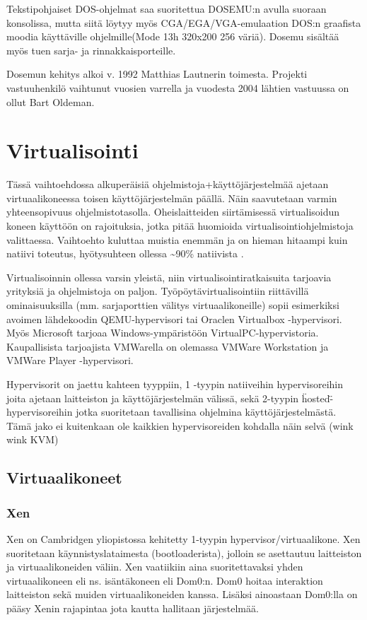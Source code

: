Tekstipohjaiset DOS-ohjelmat saa suoritettua DOSEMU:n avulla suoraan konsolissa, mutta siitä löytyy myös CGA/EGA/VGA-emulaation DOS:n graafista moodia käyttäville ohjelmille(Mode 13h 320x200 256 väriä). Dosemu sisältää myös tuen sarja- ja rinnakkaisporteille.

Dosemun kehitys alkoi v. 1992 Matthias Lautnerin toimesta. Projekti vastuuhenkilö vaihtunut vuosien varrella ja vuodesta 2004 lähtien vastuussa on ollut Bart Oldeman.




\section{Virtualisointi}

Tässä vaihtoehdossa alkuperäisiä ohjelmistoja+käyttöjärjestelmää ajetaan virtuaalikoneessa toisen käyttöjärjestelmän päällä. Näin saavutetaan varmin yhteensopivuus ohjelmistotasolla. Oheislaitteiden siirtämisessä virtualisoidun koneen käyttöön on rajoituksia, jotka pitää huomioida virtualisointiohjelmistoja valittaessa. Vaihtoehto kuluttaa muistia enemmän ja on hieman hitaampi kuin natiivi toteutus, hyötysuhteen ollessa \textasciitilde{}90\%  natiivista \cite{virtnat_anadtech}.

Virtualisoinnin ollessa varsin yleistä, niin virtualisointiratkaisuita tarjoavia yrityksiä ja ohjelmistoja on paljon. Työpöytävirtualisointiin riittävillä ominaisuuksilla (mm. sarjaporttien välitys virtuaalikoneille) sopii esimerkiksi avoimen lähdekoodin QEMU-hypervisori tai Oraclen Virtualbox -hypervisori. Myös Microsoft tarjoaa Windows-ympäristöön VirtualPC-hypervistoria. Kaupallisista tarjoajista VMWarella on olemassa VMWare Workstation ja VMWare Player -hypervisori.

Hypervisorit on jaettu kahteen tyyppiin, 1 -tyypin natiiveihin hypervisoreihin joita ajetaan laitteiston ja käyttöjärjestelmän välissä, sekä 2-tyypin \"hosted\" -hypervisoreihin jotka suoritetaan tavallisina ohjelmina käyttöjärjestelmästä. Tämä jako ei kuitenkaan ole kaikkien hypervisoreiden kohdalla näin selvä (wink wink KVM)


\subsection{Virtuaalikoneet}
\subsubsection{Xen}
Xen on Cambridgen yliopistossa kehitetty 1-tyypin hypervisor/virtuaalikone. Xen suoritetaan käynnistyslataimesta (bootloaderista), jolloin se asettautuu laitteiston ja virtuaalikoneiden väliin. Xen vaatiikiin aina suoritettavaksi yhden virtuaalikoneen eli ns. isäntäkoneen eli Dom0:n. Dom0 hoitaa interaktion laitteiston sekä muiden virtuaalikoneiden kanssa. Lisäksi ainoastaan Dom0:lla on pääsy Xenin rajapintaa jota kautta hallitaan järjestelmää.


